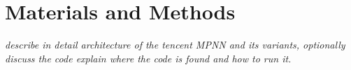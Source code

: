 \chapter{Materials and Methods}
\label{chapter:Methods}


\textit{describe in detail architecture of the tencent MPNN and its variants, optionally discuss the code explain where the code is found and how to run it.}